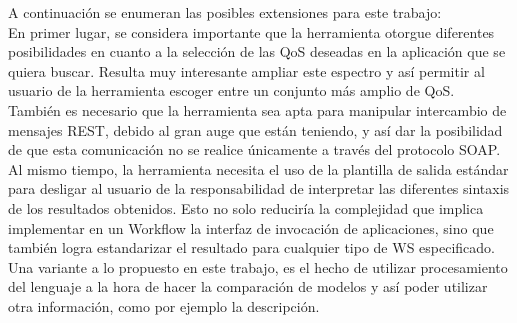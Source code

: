 A continuación se enumeran las posibles extensiones para este trabajo:\\

En primer lugar, se considera importante que la herramienta otorgue diferentes posibilidades en cuanto a la selección de las QoS deseadas en la aplicación que se quiera buscar. Resulta muy interesante ampliar este espectro y así permitir al usuario de la herramienta escoger entre un conjunto más amplio de QoS.\\

También es necesario que la herramienta sea apta para manipular intercambio de mensajes REST, debido al gran auge que están teniendo, y así dar la posibilidad de que esta comunicación no se realice únicamente a través del protocolo SOAP.\\

Al mismo tiempo, la herramienta necesita el uso de la plantilla de salida estándar para desligar al usuario de la responsabilidad de interpretar las diferentes sintaxis de los resultados obtenidos. Esto no solo reduciría la complejidad que implica implementar en un Workflow la interfaz de invocación de aplicaciones, sino que también logra estandarizar el resultado para cualquier tipo de WS especificado.\\

Una variante a lo propuesto en este trabajo, es el hecho de utilizar procesamiento del lenguaje a la hora de hacer la comparación de modelos y así poder utilizar otra información, como por ejemplo la descripción. 